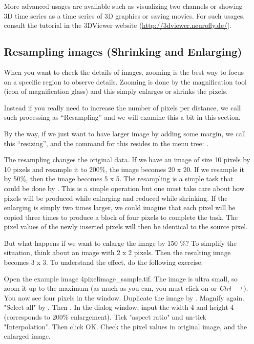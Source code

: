 More advanced usages are available such as visualizing two channels or showing 3D time series as a time series of 3D graphics or saving movies. For such usages, consult the tutorial in the 3DViewer website (\url{http://3dviewer.neurofly.de/}).  

\subsection{Resampling images (Shrinking and Enlarging)}

When you want to check the details of images, zooming is the best way to focus on a specific region to observe details.  Zooming is done by the magnification tool (icon of
magnification glass) and this simply enlarges or shrinks the pixels.

Instead if you really need to increase the number of pixels per distance, we call such processing as ``Resampling'' and we will examine this a bit in this section. 

By the way, if we just want to have larger image by adding some margin, we call this ``resizing'', and the command for this resides in the menu tree: .

The resampling changes the original data. If we
have an image of size 10 pixels by 10 pixels and resample it to 200\%, the image
becomes 20 x 20.
If we resample it by 50\%, then the image becomes 5 x 5. The resampling is a simple task
that could be done by . This is a simple
operation but one must take care about how pixels will be produced while
enlarging and reduced while shrinking. If the enlarging is simply two times
larger, we could imagine that each pixel will be copied three times to produce a
block of four pixels to complete the task. The pixel values of the newly
inserted pixels will then be identical to the source pixel.

But what happens if we want to enlarge the image by 150 \%? To simplify the
situation, think about an image with 2 x 2 pixels. Then the resulting image
becomes 3 x 3. To understand the effect, do the following exercise.


\begin{indentexercise}{1}
Open the example image
4pixelimage\_sample.tif. The image is ultra small, so zoom it
up to the maximum (as much as you can, you must click on or
\textit{Ctrl - +}). You now see four pixels in the window.
Duplicate the image by .
Magnify again. "Select all" by
.
Then .
In the dialog window, input the width 4 and height 4 (corresponds to
200\% enlargement). Tick "aspect
ratio" and
un-tick "Interpolation". Then click
OK. Check the pixel values in original image, and the enlarged image.
\end{indentexercise}

